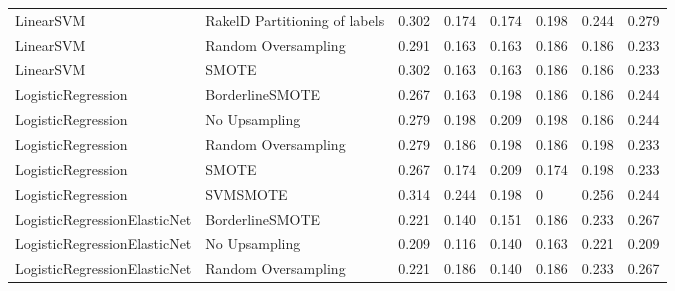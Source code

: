 \begin{tabular}{llllllll}
                      LinearSVM & RakelD Partitioning of labels & 0.302 &                     0.174 &                 0.174 &                  0.198 &                                   0.244 &     0.279 \\
                      LinearSVM &           Random Oversampling & 0.291 &                     0.163 &                 0.163 &                  0.186 &                                   0.186 &     0.233 \\
                      LinearSVM &                         SMOTE & 0.302 &                     0.163 &                 0.163 &                  0.186 &                                   0.186 &     0.233 \\
             LogisticRegression &               BorderlineSMOTE & 0.267 &                     0.163 &                 0.198 &                  0.186 &                                   0.186 &     0.244 \\
             LogisticRegression &                 No Upsampling & 0.279 &                     0.198 &                 0.209 &                  0.198 &                                   0.186 &     0.244 \\
             LogisticRegression &           Random Oversampling & 0.279 &                     0.186 &                 0.198 &                  0.186 &                                   0.198 &     0.233 \\
             LogisticRegression &                         SMOTE & 0.267 &                     0.174 &                 0.209 &                  0.174 &                                   0.198 &     0.233 \\
             LogisticRegression &                      SVMSMOTE & 0.314 &                     0.244 &                 0.198 &                      0 &                                   0.256 &     0.244 \\
   LogisticRegressionElasticNet &               BorderlineSMOTE & 0.221 &                     0.140 &                 0.151 &                  0.186 &                                   0.233 &     0.267 \\
   LogisticRegressionElasticNet &                 No Upsampling & 0.209 &                     0.116 &                 0.140 &                  0.163 &                                   0.221 &     0.209 \\
   LogisticRegressionElasticNet &           Random Oversampling & 0.221 &                     0.186 &                 0.140 &                  0.186 &                                   0.233 &     0.267 \\

\end{tabular}
